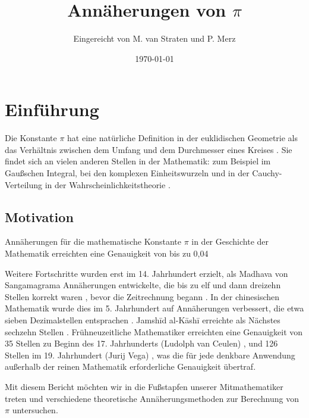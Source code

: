 \documentclass{scrartcl}
\title{Annäherungen von \(\pi\)}
\author{
  Eingereicht von M. van Straten und P. Merz
}
\date{\today}
\begin{document}
\maketitle
\cleardoublepage{}
\tableofcontents
\cleardoublepage{}

\section{Einführung}

Die Konstante \(\pi\) hat eine natürliche Definition in der euklidischen
Geometrie als das Verhältnis zwischen dem Umfang und dem Durchmesser eines
Kreises \cite{wikipedia:Pi, wikipedia:Euclidean_geometry,
    wikipedia:Circumference, wikipedia:Diameter}.
Sie findet sich an vielen anderen Stellen in der Mathematik: zum Beispiel im
Gaußschen Integral, bei den komplexen Einheitswurzeln und in der
Cauchy-Verteilung in der Wahrscheinlichkeitstheorie
\cite{wikipedia:Gaussian_integral, wikipedia:Roots_of_unity,
    wikipedia:Cauchy_distribution, wikipedia:Probability}.

\subsection{Motivation}

Annäherungen für die mathematische Konstante \(\pi\) in der Geschichte der
Mathematik erreichten eine Genauigkeit von bis zu 0,04

Weitere Fortschritte wurden erst im 14.
Jahrhundert erzielt, als Madhava von Sangamagrama Annäherungen entwickelte, die
bis zu elf und dann dreizehn Stellen korrekt waren
\cite{wikipedia:Madhava_of_Sangamagrama}, bevor die Zeitrechnung begann
\cite{wikipedia:Approximation, wikipedia:Pi, wikipedia:History_of_mathematics}.
In der chinesischen Mathematik wurde dies im 5.
Jahrhundert auf Annäherungen verbessert, die etwa sieben Dezimalstellen
entsprachen \cite{wikipedia:Chinese_mathematics}.
Jamshīd al-Kāshī erreichte als Nächstes sechzehn Stellen
\cite{wikipedia:Jamshid_al-Kashi}.
Frühneuzeitliche Mathematiker erreichten eine Genauigkeit von 35 Stellen zu
Beginn des 17.
Jahrhunderts (Ludolph van Ceulen) \cite{wikipedia:Ludolph_van_Ceulen}, und 126
Stellen im 19.
Jahrhundert (Jurij Vega) \cite{wikipedia:Jurij_Vega}, was die für jede denkbare
Anwendung außerhalb der reinen Mathematik erforderliche Genauigkeit übertraf.

Mit diesem Bericht möchten wir in die Fußstapfen unserer Mitmathematiker treten
und verschiedene theoretische Annäherungsmethoden zur Berechnung von \(\pi\)
untersuchen.
\end{document}
